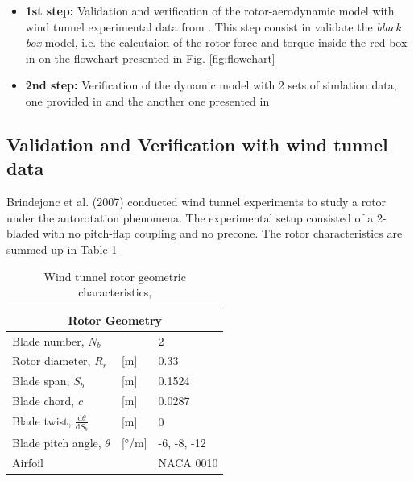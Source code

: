 \begin{itemize}
    \item \textbf{1st step:} Validation and verification of the rotor-aerodynamic model with wind tunnel experimental data from \cite{brindejonc_design_2007}. This step consist in validate the \textit{black box} model, i.e. the calcutaion of the rotor force and torque inside the red box in on the flowchart presented in Fig. \ref{fig:flowchart}
    
    \item \textbf{2nd step:} Verification of the dynamic model with 2 sets of simlation data, one provided in \cite{marques_rocket_2022} and the another one presented in \cite{riegler_daedalus_2018}
\end{itemize}

\subsection{Validation and Verification with wind tunnel data}

Brindejonc et al. (2007) \cite{brindejonc_design_2007} conducted wind tunnel experiments to study a rotor under the autorotation phenomena. The experimental setup consisted of a 2-bladed with no pitch-flap coupling and no precone. The rotor characteristics are summed up in Table \ref{tb:geo_paper_validation}

\begin{table}[!htb]
    \centering
    \begin{tabular}{@{}lll@{}}
    \toprule
    \multicolumn{3}{c}{Rotor Geometry} \\ \midrule
    Blade number, $N_b$                   &  & 2           \\
    Rotor diameter, $R_r$ & [\unit{m}]              & 0.33        \\
    Blade span, $S_b$ & [\unit{m}]                  & 0.1524      \\
    Blade chord, $c$ & [\unit{m}]                 & 0.0287      \\
    Blade twist, $\frac{\mathrm{d}\theta}{\mathrm{d}S_b}$ & [\unit{m}]                 & 0           \\
    Blade pitch angle, $\theta$ & [\unit{\degree / m}] & -6, -8, -12 \\
    Airfoil                               &  & NACA 0010   \\ \bottomrule
    \end{tabular}\
    \caption[Wind tunnel rotor geometric characteristics]{Wind tunnel rotor geometric characteristics, \cite{brindejonc_design_2007}}
    \label{tb:geo_paper_validation}
\end{table}

